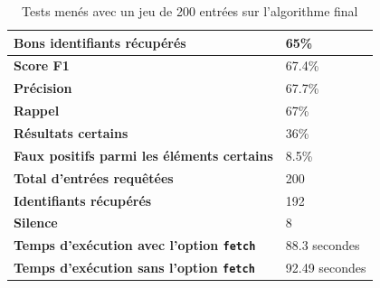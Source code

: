 \begin{table}[h]
	\centering
	\begin{tabular}{m{10cm}m{4cm}}
		\textbf{Bons identifiants récupérés} & 65\% \\
		\hline
		\textbf{Score F1 } & 67.4\% \\
		\hline
		\textbf{Précision } & 67.7\% \\
		\hline
		\textbf{Rappel } & 67\% \\
		\hline
		\textbf{Résultats certains } & 36\% \\
		\hline
		\textbf{Faux positifs parmi les éléments certains} & 8.5\% \\
		\hline
		\textbf{Total d'entrées requêtées } & 200 \\
		\hline
		\textbf{Identifiants récupérés } & 192 \\
		\hline
		\textbf{Silence } & 8 \\
		\hline
		\textbf{Temps d'exécution avec l'option \texttt{fetch} } & 88.3 secondes \\
		\hline
		\textbf{Temps d'exécution sans l'option \texttt{fetch}} & 92.49 secondes \\
	\end{tabular}
	\caption{Tests menés avec un jeu de 200 entrées sur l'algorithme final}
	\label{appendix:testfinal}
\end{table}

